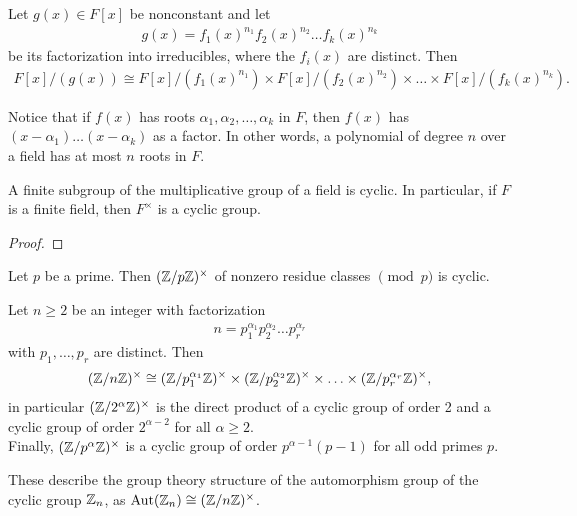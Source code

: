 \documentclass{memoir}
\begin{document}
\begin{prop}
	Let \(g(x) \in F[x]\) be nonconstant and let
	\begin{align*}
		g(x) = f_1(x)^{n_1}f_2(x)^{n_2}\ldots f_k(x)^{n_k}
	\end{align*}
	be its factorization into irreducibles, where the \(f_i(x)\) are distinct. Then
	\begin{align*}
		F[x] / (g(x)) \cong F[x] / (f_1(x)^{n_1}) \times F[x] / (f_2(x)^{n_2}) \times  \ldots \times F[x] / (f_k(x)^{n_k}).
	\end{align*}
\end{prop}

Notice that if \(f(x)\) has roots \(\alpha_1,\alpha_2,\ldots,\alpha_k\) in \(F\), then \(f(x)\) has \((x-\alpha_1)\ldots(x-\alpha_k)\) as a factor. In other words, a polynomial of degree \(n\) over a field has at most \(n\) roots in \(F\).

\begin{prop}
	A finite subgroup of the multiplicative group of a field is cyclic. In particular, if \(F\) is a finite field, then \(F^{\times }\) is a cyclic group.
\end{prop}
\begin{proof}
	
\end{proof}

\begin{cor}
	Let \(p\) be a prime. Then \((\mathbb{Z} / p\mathbb{Z})^{\times }\) of nonzero residue classes \(\pmod{p}\) is cyclic.
\end{cor}

\begin{cor}
	Let \(n\geq 2\) be an integer with factorization
	\begin{align*}
		n = p_1^{\alpha_1}p_2^{\alpha_2}\ldots p_r^{\alpha_r}
	\end{align*}
	with \(p_1,\ldots,p_r\) are distinct. Then
	\begin{align*}
		(\mathbb{Z} / n\mathbb{Z})^{\times } \cong ( \mathbb{Z}/ p_1^{\alpha_1} \mathbb{Z})^{\times } \times (\mathbb{Z} / p_2^{\alpha_2}\mathbb{Z})^{\times } \times \ldots \times (\mathbb{Z} / p_r^{\alpha_r}\mathbb{Z})^{\times },
	\end{align*}
	in particular \((\mathbb{Z} / 2^{\alpha }\mathbb{Z})^{\times }\) is the direct product of a cyclic group of order 2 and a cyclic group of order \(2^{\alpha -2}\) for all \(\alpha \geq 2\).\\

	Finally, \((\mathbb{Z} / p^{\alpha }\mathbb{Z})^{\times }\) is a cyclic group of order \(p^{\alpha-1}(p-1)\) for all odd primes \(p\).
\end{cor}
These describe the group theory structure of the automorphism group of the cyclic group \(\mathbb{Z}_n\), as \(\textrm{Aut}(\mathbb{Z}_n) \cong (\mathbb{Z} / n\mathbb{Z})^{\times }\).
\end{document}
